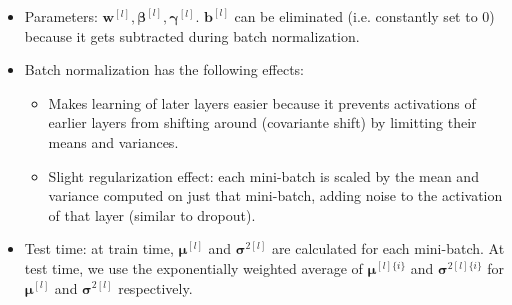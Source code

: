 \begin{itemize}
  \item Parameters: $\mathbf{w}^{[l]}, \pmb{\beta}^{[l]}, \pmb{\gamma}^{[l]}$. $\mathbf{b}^{[l]}$ can be eliminated (i.e. constantly set to 0) because it gets subtracted during batch normalization.
  \item Batch normalization has the following effects:
  \begin{itemize}
    \item Makes learning of later layers easier because it prevents activations of earlier layers from shifting around (covariante shift) by limitting their means and variances. 
    \item Slight regularization effect: each mini-batch is scaled by the mean and variance computed on just that mini-batch, adding noise to the activation of that layer (similar to dropout). 
  \end{itemize}
  \item Test time: at train time, $\pmb{\mu}^{[l]}$ and $\pmb{\sigma}^{2[l]}$ are calculated for each mini-batch. At test time, we use the exponentially weighted average of $\pmb{\mu}^{[l]\{i\}}$ and $\pmb{\sigma}^{2[l]\{i\}}$ for $\pmb{\mu}^{[l]}$ and $\pmb{\sigma}^{2[l]}$ respectively.
\end{itemize}
